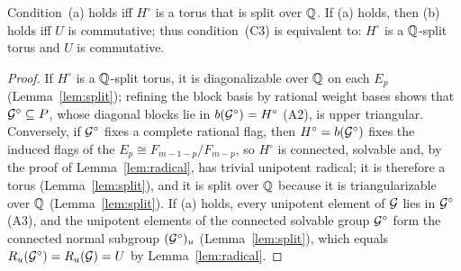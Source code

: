\begin{lemma}\label{lem:acrit}
Condition~(a) holds iff $H^\circ$ is a torus that is split over $\mathbb{Q}$. If (a) holds, then (b)
holds iff $U$ is commutative; thus condition~(C3) is equivalent to: $H^\circ$ is a $\mathbb{Q}$-split torus
and $U$ is commutative.
\end{lemma}
\begin{proof}
If $H^\circ$ is a $\mathbb{Q}$-split torus, it is diagonalizable over $\mathbb{Q}$ on each $E_p$ (Lemma~\ref{lem:split}); refining the
block basis by rational weight bases shows that $\mathcal{G}^\circ\subseteq P$, whose diagonal blocks lie in
$b(\mathcal{G}^\circ)=H^\circ$ (A2), is upper triangular. Conversely, if $\mathcal{G}^\circ$ fixes a complete rational
flag, then $H^\circ=b(\mathcal{G}^\circ)$ fixes the induced flags of the $E_p\cong F_{m-1-p}/F_{m-p}$, so
$H^\circ$ is connected, solvable and, by the proof of Lemma~\ref{lem:radical}, has trivial unipotent
radical; it is therefore a torus (Lemma~\ref{lem:split}), and it is split over $\mathbb{Q}$ because it is triangularizable over
$\mathbb{Q}$ (Lemma~\ref{lem:split}). If (a) holds, every unipotent element of $\mathcal{G}$ lies in $\mathcal{G}^\circ$ (A3), and the unipotent
elements of the connected solvable group $\mathcal{G}^\circ$ form the connected normal subgroup
$(\mathcal{G}^\circ)_u$ (Lemma~\ref{lem:split}), which equals $R_u(\mathcal{G}^\circ)=R_u(\mathcal{G})=U$ by Lemma~\ref{lem:radical}.
\end{proof}

